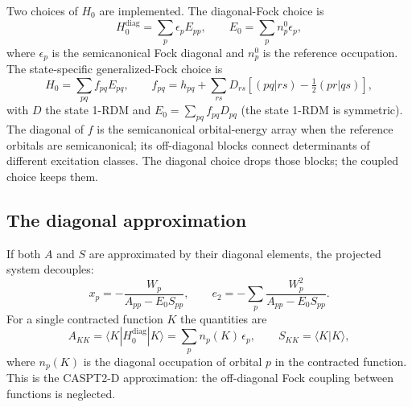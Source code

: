 Two choices of $H_0$ are implemented.  The diagonal-Fock choice is
\begin{equation}
  H_0^{\mathrm{diag}} = \sum_p \epsilon_p E_{pp},
  \qquad
  E_0 = \sum_p n_p^0\epsilon_p,
  \label{eq:caspt2-h0-diag}
\end{equation}
where $\epsilon_p$ is the semicanonical Fock diagonal and $n_p^0$ is
the reference occupation.  The state-specific generalized-Fock choice
is
\begin{equation}
  H_0 = \sum_{pq} f_{pq}E_{pq},
  \qquad
  f_{pq} = h_{pq}
         + \sum_{rs}D_{rs}\left[(pq|rs)-\tfrac{1}{2}(pr|qs)\right],
  \label{eq:caspt2-h0}
\end{equation}
with $D$ the state 1-RDM and
$E_0=\sum_{pq}f_{pq}D_{pq}$ (the state 1-RDM is symmetric).  The
diagonal of $f$ is the semicanonical
orbital-energy array when the reference orbitals are semicanonical;
its off-diagonal blocks connect determinants of different excitation
classes.  The diagonal choice drops those blocks; the coupled choice
keeps them.

\subsection{The diagonal approximation}

If both $A$ and $S$ are approximated by their diagonal elements, the
projected system decouples:
\begin{equation}
  x_p = -\frac{W_p}{A_{pp}-E_0 S_{pp}},
  \qquad
  e_2 = -\sum_p \frac{W_p^{2}}{A_{pp}-E_0 S_{pp}}.
  \label{eq:caspt2-diagonal}
\end{equation}
For a single contracted function $K$ the quantities are
\begin{equation}
  A_{KK} = \langle K|H_0^{\mathrm{diag}}|K\rangle
         = \sum_p n_p(K)\,\epsilon_p,
  \qquad
  S_{KK} = \langle K|K\rangle,
  \label{eq:caspt2-AK}
\end{equation}
where $n_p(K)$ is the diagonal occupation of orbital $p$ in the
contracted function.  This is the CASPT2-D approximation: the
off-diagonal Fock coupling between functions is neglected.


